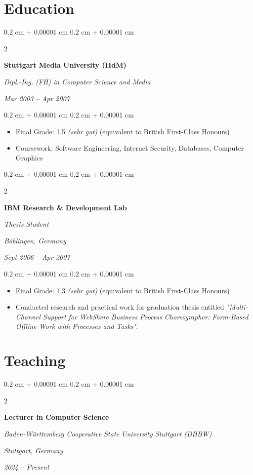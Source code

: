 \documentclass[10pt, a4paper]{article}
\newenvironment{highlights}{
    \begin{itemize}[
        topsep=0.10 cm,
        parsep=0.10 cm,
        partopsep=0pt,
        itemsep=0pt,
        leftmargin=0.4 cm + 10pt
    ]
}{
    \end{itemize}
} %
\newenvironment{onecolentry}{
    \begin{adjustwidth}{
        0.2 cm + 0.00001 cm
    }{
        0.2 cm + 0.00001 cm
    }
}{
    \end{adjustwidth}
} %
\newenvironment{twocolentry}[2][]{
    \onecolentry
    \def\secondColumn{#2}
    \setcolumnwidth{\fill, 8 cm}
    \begin{paracol}{2}
}{
    \switchcolumn \raggedleft \secondColumn
    \end{paracol}
    \endonecolentry
} %
\begin{document}
%
%
\section{Education}




\begin{twocolentry}{


        \textit{Mar 2003 – Apr 2007}}
    \textbf{Stuttgart Media University (HdM)}

    \textit{Dipl.-Ing. (FH) in Computer Science and Media}
\end{twocolentry}

\vspace{0.10 cm}
\begin{onecolentry}
    \begin{highlights}
        \item Final Grade: 1.5 \textit{(sehr gut)} (equivalent to British First-Class Honours)
        \item Coursework: Software Engineering, Internet Security, Databases, Computer Graphics
    \end{highlights}
\end{onecolentry}

\vspace{0.2 cm}

\begin{twocolentry}{

        \textit{Böblingen, Germany}

        \textit{Sept 2006 – Apr 2007}}
    \textbf{IBM Research \& Development Lab}

    \textit{Thesis Student}
\end{twocolentry}

\vspace{0.10 cm}
\begin{onecolentry}
    \begin{highlights}
        \item Final Grade: 1.3 \textit{(sehr gut)} (equivalent to British First-Class Honours)
        \item Conducted research and practical work for graduation thesis entitled \textit{"Multi-Channel Support for WebShere Business Process Choreographer: Form-Based Offline Work with Processes and Tasks"}.
    \end{highlights}
\end{onecolentry}




\section{Teaching}
\begin{twocolentry}{
        \textit{Stuttgart, Germany}

        \textit{2024 – Present}}
    \textbf{Lecturer in Computer Science}

    \textit{Baden-Württemberg Cooperative State University Stuttgart (DHBW)}
\end{twocolentry}
\end{document}
